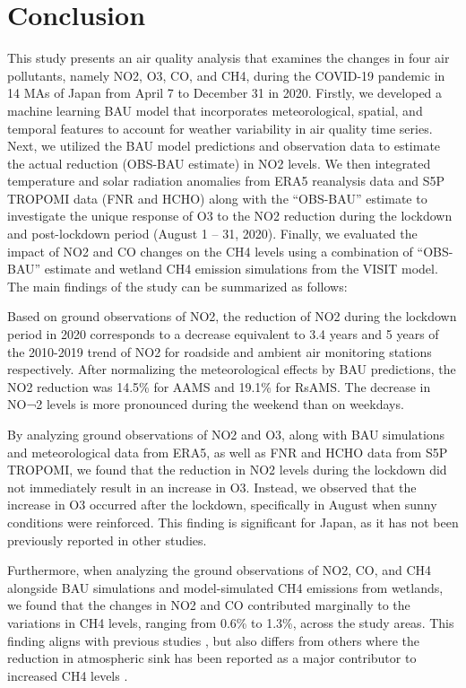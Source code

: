 \section{Conclusion} \label{chap4_conclusion}
This study presents an air quality analysis that examines the changes in four air pollutants, namely NO2, O3, CO, and CH4, during the COVID-19 pandemic in 14 MAs of Japan from April 7 to December 31 in 2020. Firstly, we developed a machine learning BAU model that incorporates meteorological, spatial, and temporal features to account for weather variability in air quality time series. Next, we utilized the BAU model predictions and observation data to estimate the actual reduction (OBS-BAU estimate) in NO2 levels. We then integrated temperature and solar radiation anomalies from ERA5 reanalysis data and S5P TROPOMI data (FNR and HCHO) along with the “OBS-BAU” estimate to investigate the unique response of O3 to the NO2 reduction during the lockdown and post-lockdown period (August 1 – 31, 2020). Finally, we evaluated the impact of NO2 and CO changes on the CH4 levels using a combination of “OBS-BAU” estimate and wetland CH4 emission simulations from the VISIT model. The main findings of the study can be summarized as follows:\par
Based on ground observations of NO2, the reduction of NO2 during the lockdown period in 2020 corresponds to a decrease equivalent to 3.4 years and 5 years of the 2010-2019 trend of NO2 for roadside and ambient air monitoring stations respectively. After normalizing the meteorological effects by BAU predictions, the NO2 reduction was 14.5\% for AAMS and 19.1\% for RsAMS. The decrease in NO¬2 levels is more pronounced during the weekend than on weekdays.\par
By analyzing ground observations of NO2 and O3, along with BAU simulations and meteorological data from ERA5, as well as FNR and HCHO data from S5P TROPOMI, we found that the reduction in NO2 levels during the lockdown did not immediately result in an increase in O3. Instead, we observed that the increase in O3 occurred after the lockdown, specifically in August when sunny conditions were reinforced. This finding is significant for Japan, as it has not been previously reported in other studies.\par
Furthermore, when analyzing the ground observations of NO2, CO, and CH4 alongside BAU simulations and model-simulated CH4 emissions from wetlands, we found that the changes in NO2 and CO contributed marginally to the variations in CH4 levels, ranging from 0.6\% to 1.3\%, across the study areas. This finding aligns with previous studies \citep{akimoto2022rethinking,qu2022attribution,feng2023methane}, but also differs from others where the reduction in atmospheric sink has been reported as a major contributor to increased CH4 levels \citep{stevenson2022covid,peng2022wetland}.\par
